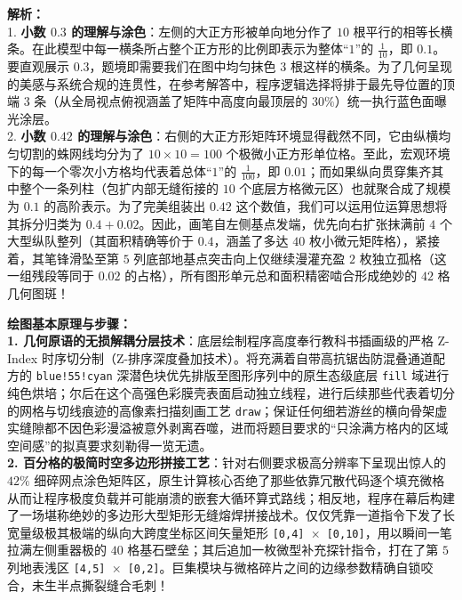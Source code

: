 \documentclass[12pt, a4paper]{ctexrep}
\begin{document}
{\small\color{gray}
\textbf{解析：}\\
1. \textbf{小数 $0.3$ 的理解与涂色}：左侧的大正方形被单向地分作了 $10$ 根平行的相等长横条。在此模型中每一横条所占整个正方形的比例即表示为整体“$1$”的 $\frac{1}{10}$，即 $0.1$。要直观展示 $0.3$，题境即需要我们在图中均匀抹色 $3$ 根这样的横条。为了几何呈现的美感与系统合规的连贯性，在参考解答中，程序逻辑选择将排于最先导位置的顶端 $3$ 条（从全局视点俯视涵盖了矩阵中高度向最顶层的 $30\%$）统一执行蓝色面曝光涂层。\\
2. \textbf{小数 $0.42$ 的理解与涂色}：右侧的大正方形矩阵环境显得截然不同，它由纵横均匀切割的蛛网线均分为了 $10 \times 10 = 100$ 个极微小正方形单位格。至此，宏观环境下的每一个零次小方格均代表着总体“$1$”的 $\frac{1}{100}$，即 $0.01$；而如果纵向贯穿集齐其中整个一条列柱（包扩内部无缝衔接的 $10$ 个底层方格微元区）也就聚合成了规模为 $0.1$ 的高阶表示。为了完美组装出 $0.42$ 这个数值，我们可以运用位运算思想将其拆分归类为 $0.4 + 0.02$。因此，画笔自左侧基点发端，优先向右扩张抹满前 $4$ 个大型纵队整列（其面积精确等价于 $0.4$，涵盖了多达 $40$ 枚小微元矩阵格），紧接着，其笔锋滑坠至第 $5$ 列底部地基点突击向上仅继续漫灌充盈 $2$ 枚独立孤格（这一组残段等同于 $0.02$ 的占格），所有图形单元总和面积精密啮合形成绝妙的 $42$ 格几何图斑！
}

\vspace{0.6cm}

{\small\color{blue!70!black}
\textbf{绘图基本原理与步骤：}\\
\textbf{1. 几何原语的无损解耦分层技术}：底层绘制程序高度奉行教科书插画级的严格 Z-Index 时序切分制（Z-排序深度叠加技术）。将充满着自带高抗锯齿防混叠通道配方的 \texttt{blue!55!cyan} 深潜色块优先排版至图形序列中的原生态级底层 \texttt{fill} 域进行纯色烘培；尔后在这个高强色彩膜壳表面启动独立线程，进行后续那些代表着切分的网格与切线痕迹的高像素扫描刻画工艺 \texttt{draw}；保证任何细若游丝的横向骨架虚实缝隙都不因色彩漫溢被意外剥离吞噬，进而将题目要求的“只涂满方格内的区域空间感”的拟真要求刻勒得一览无遗。\\
\textbf{2. 百分格的极简时空多边形拼接工艺}：针对右侧要求极高分辨率下呈现出惊人的 $42\%$ 细碎网点涂色矩阵区，原生计算核心否绝了那些依靠冗散代码逐个填充微格从而让程序极度负载并可能崩溃的嵌套大循环算式路线；相反地，程序在幕后构建了一场堪称绝妙的多边形大型矩形无缝熔焊拼接战术。仅仅凭靠一道指令下发了长宽量级极其极端的纵向大跨度坐标区间矢量矩形 \texttt{[0,4] $\times$ [0,10]}，用以瞬间一笔拉满左侧重器极的 $40$ 格基石壁垒；其后追加一枚微型补充探针指令，打在了第 $5$ 列地表浅区 \texttt{[4,5] $\times$ [0,2]}。巨集模块与微格碎片之间的边缘参数精确自锁咬合，未生半点撕裂缝合毛刺！
}
\end{document}
